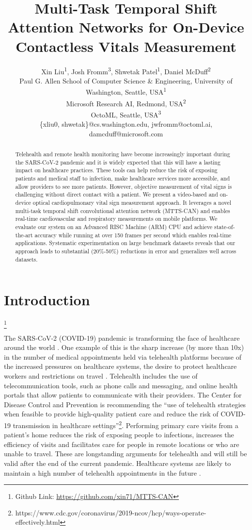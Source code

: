 \documentclass{article}
\title{Multi-Task Temporal Shift Attention Networks for On-Device Contactless Vitals Measurement}
\author{Xin Liu\textsuperscript{1},
  Josh Fromm\textsuperscript{3},
  Shwetak Patel\textsuperscript{1},
  Daniel McDuff\textsuperscript{2}\\
  Paul G. Allen School of Computer Science \& Engineering, University of Washington, Seattle, USA\textsuperscript{1}\\
  Microsoft Research AI, Redmond, USA\textsuperscript{2} \\
  OctoML, Seattle, USA\textsuperscript{3}
 \\
 \{xliu0, shwetak\}@cs.washington.edu, jwfromm@octoml.ai, damcduff@microsoft.com
 }
\newcommand\blfootnote[1]{\begingroup
  \renewcommand\thefootnote{}\footnote{#1}\addtocounter{footnote}{-1}\endgroup
}
\begin{document}
\maketitle

\begin{abstract}

Telehealth and remote health monitoring have become increasingly important during the SARS-CoV-2 pandemic and it is widely expected that this will have a lasting impact on healthcare practices. These tools can help reduce the risk of exposing patients and medical staff to infection, make healthcare services more accessible, and allow providers to see more patients. However, objective measurement of vital signs is challenging without direct contact with a patient. We present a video-based and on-device optical cardiopulmonary vital sign measurement approach. It leverages a novel multi-task temporal shift convolutional attention network (MTTS-CAN) and enables real-time cardiovascular and respiratory measurements on mobile platforms. We evaluate our system on an Advanced RISC Machine (ARM) CPU and achieve state-of-the-art accuracy while running at over 150 frames per second which enables real-time applications. Systematic experimentation on large benchmark datasets reveals that our approach leads to substantial (20\%-50\%) reductions in error and generalizes well across datasets.
\end{abstract}
\section{Introduction}
\blfootnote{Github Link: \url{https://github.com/xin71/MTTS-CAN}}
The SARS-CoV-2 (COVID-19) pandemic is transforming the face of healthcare around the world \citep{song2020role,smith2020telehealth}. One example of this is the sharp increase (by more than 10x) in the number of medical appointments held via telehealth platforms because of the increased pressures on healthcare systems, the desire to protect healthcare workers and restrictions on travel \citep{smith2020telehealth}. Telehealth includes the use of telecommunication tools, such as phone calls and messaging, and online health portals that allow patients to communicate with their providers. The Center for Disease Control and Prevention is recommending the ``use of telehealth strategies when feasible to provide high-quality patient care and reduce the risk of COVID-19 transmission in healthcare settings''\footnote{https://www.cdc.gov/coronavirus/2019-ncov/hcp/ways-operate-effectively.html}.
Performing primary care visits from a patient's home reduces the risk of exposing people to infections, increases the efficiency of visits and facilitates care for people in remote locations or who are unable to travel. These are longstanding arguments for telehealth and will still be valid after the end of the current pandemic. Healthcare systems are likely to maintain a high number of telehealth appointments in the future \citep{pollock2020embracing}. 
\end{document}
